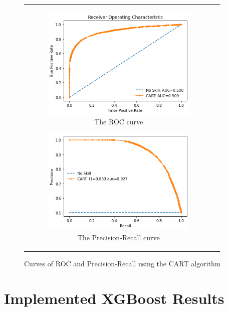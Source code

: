 \begin{figure}[H]
\begin{tabular}{@{}cc@{}}
\begin{subfigure}{0.5\textwidth}
  \centering
  \includegraphics[width=7.5cm]{fig/chapter5/CART/ROC_new.png}
  \caption{\footnotesize{The \acrshort{ROC} curve}}
  \label{fig:cartroc}
\end{subfigure} 
\begin{subfigure}{0.5\textwidth}
  \centering
  \includegraphics[width=7.5cm]{fig/chapter5/CART/Precision-Recall_new.png}
  \caption{\footnotesize{The Precision-Recall curve}}
  \label{fig:cartprerec}
\end{subfigure} \\
\end{tabular}
\caption{Curves of \acrshort{ROC} and Precision-Recall using the \acrshort{CART} algorithm}
\label{fig:cartcurves}
\end{figure}

\section{Implemented XGBoost Results}

